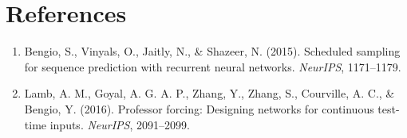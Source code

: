 \documentclass[11pt,a4paper]{article}
\theoremstyle{definition}
\begin{document}
\section{References}
\begin{enumerate}
    \item Bengio, S., Vinyals, O., Jaitly, N., & Shazeer, N. (2015). Scheduled sampling for sequence prediction with recurrent neural networks. \emph{NeurIPS}, 1171--1179.
    \item Lamb, A. M., Goyal, A. G. A. P., Zhang, Y., Zhang, S., Courville, A. C., & Bengio, Y. (2016). Professor forcing: Designing networks for continuous test-time inputs. \emph{NeurIPS}, 2091--2099.
\end{enumerate}
\end{document}
